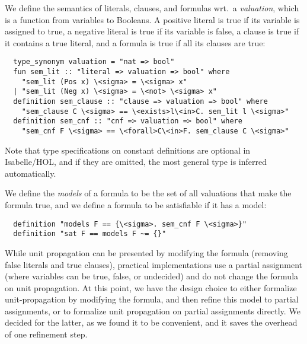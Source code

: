 \documentclass[smallcondensed]{svjour3}     %
\begin{document}
We define the semantics of literals, clauses, and formulas wrt.~a \emph{valuation}, which is a function from variables to Booleans.
A positive literal is true if its variable is assigned to true, a negative literal is true if its variable is false, a clause is true if it
contains a true literal, and a formula is true if all its clauses are true:
\begin{lstlisting}
  type_synonym valuation = "nat => bool"
  fun sem_lit :: "literal => valuation => bool" where
    "sem_lit (Pos x) \<sigma> = \<sigma> x"
  | "sem_lit (Neg x) \<sigma> = \<not> \<sigma> x"
  definition sem_clause :: "clause => valuation => bool" where
    "sem_clause C \<sigma> == \<exists>l\<in>C. sem_lit l \<sigma>"
  definition sem_cnf :: "cnf => valuation => bool" where
    "sem_cnf F \<sigma> == \<forall>C\<in>F. sem_clause C \<sigma>"
\end{lstlisting}
Note that type specifications on constant definitions are optional in Isabelle/HOL, and if they are omitted, the most general type is inferred automatically.

We define the \emph{models} of a formula to be the set of all valuations that make the formula true, 
and we define a formula to be satisfiable if it has a model:
\begin{lstlisting}
  definition "models F == {\<sigma>. sem_cnf F \<sigma>}"
  definition "sat F == models F ~= {}"
\end{lstlisting}

While unit propagation can be presented by modifying the formula (removing false literals and true clauses),
practical implementations use a partial assignment (where variables can be true, false, or undecided) and do not change the formula on unit propagation.
At this point, we have the design choice to either formalize unit-propagation by modifying the formula, and then refine this model to partial 
assignments, or to formalize unit propagation on partial assignments directly. We decided for the latter, as we found it to be convenient, 
and it saves the overhead of one refinement step.
\end{document}
